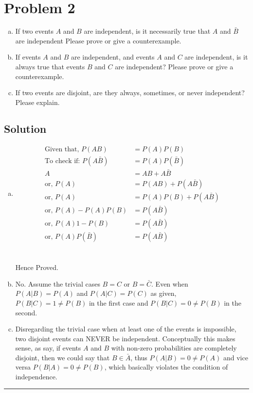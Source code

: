 \section{Problem 2}

\begin{enumerate}[a.]
	\item If two events $A$ and $B$ are independent, is it necessarily true that $A$ and $\bar{B}$ are independent Please prove or give a counterexample.
	\item If events $A$ and $B$ are independent, and events $A$ and $C$ are independent, is it always true that events $B$ and $C$ are independent? Please prove or give a counterexample.
	\item If two events are disjoint, are they always, sometimes, or never independent? Please explain.
\end{enumerate}

\subsection{Solution}
\begin{enumerate}[a.]
	\item
	\begin{align}
		\text{Given that, } P(AB) &= P(A)P(B) \label{eq:given1} \\
		\text{To check if: } P(A\bar{B}) &= P(A)P(\bar{B}) \label{eq:toCheck1} \\
		A &= AB + A\bar{B} \label{eq:LOTPAB}\\
		\text{or, } P(A) &= P(AB) + P(A\bar{B}) \nonumber\\
		\text{or, } P(A) &= P(A)P(B) + P(A\bar{B}) \nonumber\\
		\text{or, } P(A) - P(A)P(B) &= P(A\bar{B}) \nonumber\\
		\text{or, } P(A){1-P(B)} &= P(A\bar{B}) \nonumber\\
		\text{or, } P(A)P(\bar{B}) &= P(A\bar{B}) \nonumber
	\end{align}
	 \\
	\\
	Hence Proved.\Laughey
	
	\item No. Assume the trivial cases $B = C$ or $B = \bar{C}$. Even when $P(A|B) = P(A)$ and $P(A|C) = P(C)$ as given, $P(B|C) = 1 \neq P(B)$ in the first case and $P(B|C) = 0 \neq P(B)$ in the second.
	
	\item Disregarding the trivial case when at least one of the events is impossible, two disjoint events can NEVER be independent. Conceptually this makes sense, as say, if events $A$ and $B$ with non-zero probabilities are completely disjoint, then we could say that $B \in \bar{A}$, thus $P(A|B) = 0 \neq P(A)$ and vice versa $P(B|A) = 0 \neq P(B)$, which basically violates the condition of independence.
\end{enumerate} 
\noindent\rule{\textwidth}{1pt}